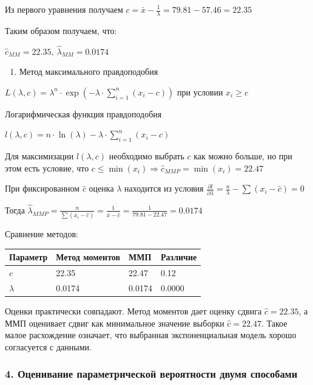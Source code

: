 \documentclass[11pt]{article}
\providecommand{\tightlist}{%
      \setlength{\itemsep}{0pt}\setlength{\parskip}{0pt}}
\begin{document}
Из первого уравнения получаем
\(c = \bar{x} - \frac{1}{\lambda} = 79.81 - 57.46 = 22.35\)

Таким образом получаем, что:

\(\hat{c}_{MM} = 22.35, \ \hat{\lambda}_{MM} = 0.0174\)

\begin{enumerate}
\def\labelenumi{\arabic{enumi}.}
\setcounter{enumi}{1}
\tightlist
\item
  Метод максимального правдоподобия
\end{enumerate}

\(L(\lambda, c) = \lambda^n \cdot \exp\left(-\lambda \cdot \sum_{i = 1}^n (x_i - c)\right)\)
при условии \(x_i \geq c\)

Логарифмическая функция правдоподобия

\(l(\lambda, c) = n \cdot \ln(\lambda) - \lambda \cdot \sum_{i = 1}^n (x_i - c)\)

Для максимизации \(l(\lambda, c)\) необходимо выбрать \(c\) как можно
больше, но при этом есть условие, что
\(c \leq \min(x_i) \Rightarrow \hat{c}_{MMP} = \min(x_i) = 22.47\)

При фиксированном \(\hat{c}\) оценка \(\lambda\) находится из условия
\(\frac{\partial l}{\partial \lambda} = \frac{n}{\lambda} - \sum(x_i - \hat{c}) = 0\)

Тогда
\(\hat{\lambda}_{MMP} = \frac{n}{\sum (x_i - \hat{c})} = \frac{1}{\bar{x} - \hat{c}} = \frac{1}{79.81 - 22.47} = 0.0174\)

Сравнение методов:

{\def\LTcaptype{none} %
\begin{longtable}[]{@{}llll@{}}
\toprule\noalign{}
Параметр & Метод моментов & ММП & Различие \\
\midrule\noalign{}
\endhead
\bottomrule\noalign{}
\endlastfoot
\(c\) & 22.35 & 22.47 & 0.12 \\
\(\lambda\) & 0.0174 & 0.0174 & 0.0000 \\
\end{longtable}
}

Оценки практически совпадают. Метод моментов дает оценку сдвига
\(\hat{c} = 22.35\), а ММП оценивает сдвиг как минимальное значение
выборки \(\hat{c} = 22.47\). Такое малое расхождение означает, что
выбранная экспоненциальная модель хорошо согласуется с данными.

    \subsubsection{4. Оценивание параметрической вероятности двумя
способами}\label{ux43eux446ux435ux43dux438ux432ux430ux43dux438ux435-ux43fux430ux440ux430ux43cux435ux442ux440ux438ux447ux435ux441ux43aux43eux439-ux432ux435ux440ux43eux44fux442ux43dux43eux441ux442ux438-ux434ux432ux443ux43cux44f-ux441ux43fux43eux441ux43eux431ux430ux43cux438}
\end{document}
